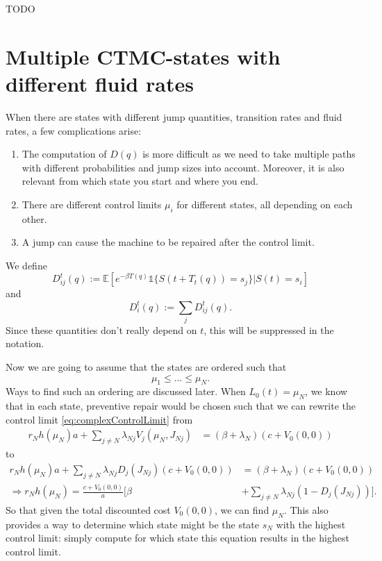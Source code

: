 TODO
\section{Multiple CTMC-states with different fluid rates}
When there are states with different jump quantities, transition rates and fluid rates, a few complications arise:
\begin{enumerate}
\item The computation of $D(q)$ is more difficult as we need to take multiple paths with different probabilities and jump sizes into account. Moreover, it is also relevant from which state you start and where you end.
\item There are different control limits $\mu_i$ for different states, all depending on each other.
\item A jump can cause the machine to be repaired after the control limit. 
\end{enumerate}
We define 
$$D^{t}_{ij}(q):=\mathbb{E}[e^{-\beta T(q)}\mathds{1}\{S(t+T_t(q))=s_j\}|S(t)=s_i]$$
and
$$D^{t}_{i}(q):=\sum\limits_{j}D^{t}_{ij}(q).$$
Since these quantities don't really depend on $t$, this will be suppressed in the notation.

Now we are going to assume that the states are ordered such that
$$
\mu_1\leq ... \leq \mu_{N}.
$$
Ways to find such an ordering are discussed later.
When $L_0(t)=\mu_N$, we know that in each state, preventive repair would be chosen such that we can rewrite the control limit \eqref{eq:complexControlLimit} from
\begin{equation}
\begin{split}
r_N h(\mu_N)a+\sum\limits_{j\neq N}\lambda_{Nj}V_j(\mu_N,J_{Nj})&=(\beta+\lambda_N)(c+V_0(0,0))
\end{split}
\end{equation}
to
\begin{equation}\label{eq:controlN}
\begin{split}
r_N h(\mu_N)a+\sum\limits_{j\neq N}\lambda_{Nj}D_j(J_{Nj})(c+V_0(0,0))&=(\beta+\lambda_N)(c+V_0(0,0))\\
\Rightarrow r_N h(\mu_N)=\frac{c+V_0(0,0)}{a}[\beta&+\sum\limits_{j\neq N}\lambda_{Nj}(1-D_j(J_{Nj}))].
\end{split}
\end{equation}
So that given the total discounted cost $V_0(0,0)$, we can find $\mu_N$.
This also provides a way to determine which state might be the state $s_N$ with the highest control limit: simply compute for which state this equation results in the highest control limit.

